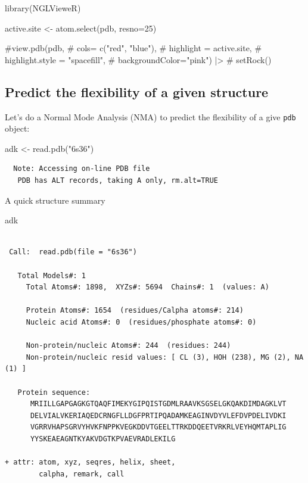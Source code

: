\documentclass[
  letterpaper,
  DIV=11,
  numbers=noendperiod]{scrartcl}
\newenvironment{Shaded}{\begin{snugshade}}{\end{snugshade}}
\newcommand{\AttributeTok}[1]{\textcolor[rgb]{0.40,0.45,0.13}{#1}}
\newcommand{\CommentTok}[1]{\textcolor[rgb]{0.37,0.37,0.37}{#1}}
\newcommand{\DecValTok}[1]{\textcolor[rgb]{0.68,0.00,0.00}{#1}}
\newcommand{\FunctionTok}[1]{\textcolor[rgb]{0.28,0.35,0.67}{#1}}
\newcommand{\NormalTok}[1]{\textcolor[rgb]{0.00,0.23,0.31}{#1}}
\newcommand{\OtherTok}[1]{\textcolor[rgb]{0.00,0.23,0.31}{#1}}
\newcommand{\StringTok}[1]{\textcolor[rgb]{0.13,0.47,0.30}{#1}}
\begin{document}
\begin{Shaded}
\begin{Highlighting}[]
\FunctionTok{library}\NormalTok{(NGLVieweR)}

\NormalTok{active.site }\OtherTok{\textless{}{-}} \FunctionTok{atom.select}\NormalTok{(pdb, }\AttributeTok{resno=}\DecValTok{25}\NormalTok{)}

\CommentTok{\#view.pdb(pdb, }
\CommentTok{\#         cols= c("red", "blue"),}
\CommentTok{\#         highlight = active.site, }
\CommentTok{\#         highlight.style = "spacefill",}
\CommentTok{\#         backgroundColor="pink") |\textgreater{}}
\CommentTok{\#  setRock()}
\end{Highlighting}
\end{Shaded}

\subsection{Predict the flexibility of a given
structure}\label{predict-the-flexibility-of-a-given-structure}

Let's do a Normal Mode Analysis (NMA) to predict the flexibility of a
give \texttt{pdb} object:

\begin{Shaded}
\begin{Highlighting}[]
\NormalTok{adk }\OtherTok{\textless{}{-}} \FunctionTok{read.pdb}\NormalTok{(}\StringTok{"6s36"}\NormalTok{)}
\end{Highlighting}
\end{Shaded}

\begin{verbatim}
  Note: Accessing on-line PDB file
   PDB has ALT records, taking A only, rm.alt=TRUE
\end{verbatim}

A quick structure summary

\begin{Shaded}
\begin{Highlighting}[]
\NormalTok{adk}
\end{Highlighting}
\end{Shaded}

\begin{verbatim}

 Call:  read.pdb(file = "6s36")

   Total Models#: 1
     Total Atoms#: 1898,  XYZs#: 5694  Chains#: 1  (values: A)

     Protein Atoms#: 1654  (residues/Calpha atoms#: 214)
     Nucleic acid Atoms#: 0  (residues/phosphate atoms#: 0)

     Non-protein/nucleic Atoms#: 244  (residues: 244)
     Non-protein/nucleic resid values: [ CL (3), HOH (238), MG (2), NA (1) ]

   Protein sequence:
      MRIILLGAPGAGKGTQAQFIMEKYGIPQISTGDMLRAAVKSGSELGKQAKDIMDAGKLVT
      DELVIALVKERIAQEDCRNGFLLDGFPRTIPQADAMKEAGINVDYVLEFDVPDELIVDKI
      VGRRVHAPSGRVYHVKFNPPKVEGKDDVTGEELTTRKDDQEETVRKRLVEYHQMTAPLIG
      YYSKEAEAGNTKYAKVDGTKPVAEVRADLEKILG

+ attr: atom, xyz, seqres, helix, sheet,
        calpha, remark, call
\end{verbatim}
\end{document}
